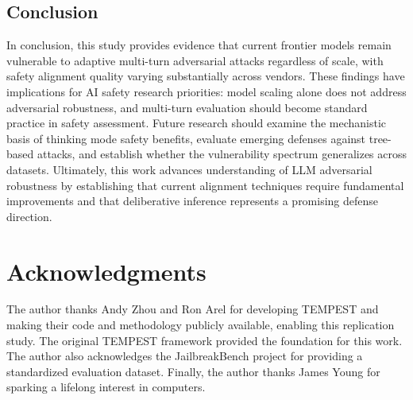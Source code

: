 \documentclass[11pt,a4paper]{article}
\begin{document}
\subsection{Conclusion}

In conclusion, this study provides evidence that current frontier models remain vulnerable to adaptive multi-turn adversarial attacks regardless of scale, with safety alignment quality varying substantially across vendors. These findings have implications for AI safety research priorities: model scaling alone does not address adversarial robustness, and multi-turn evaluation should become standard practice in safety assessment. Future research should examine the mechanistic basis of thinking mode safety benefits, evaluate emerging defenses against tree-based attacks, and establish whether the vulnerability spectrum generalizes across datasets. Ultimately, this work advances understanding of LLM adversarial robustness by establishing that current alignment techniques require fundamental improvements and that deliberative inference represents a promising defense direction.

\section*{Acknowledgments}

The author thanks Andy Zhou and Ron Arel for developing TEMPEST and making their code and methodology publicly available, enabling this replication study. The original TEMPEST framework \cite{zhou2025tempest} provided the foundation for this work. The author also acknowledges the JailbreakBench project for providing a standardized evaluation dataset. Finally, the author thanks James Young for sparking a lifelong interest in computers.
\end{document}
